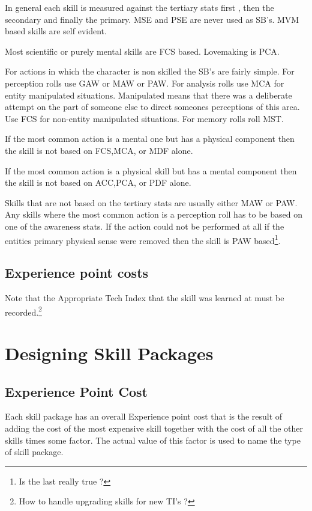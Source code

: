In general each skill is measured against the tertiary stats first , then the 
secondary and finally the primary. MSE and PSE are never used as SB's.
MVM based skills are self evident. 

Most scientific or purely mental skills are FCS based.
Lovemaking is PCA.

For actions in which the character is non skilled the SB's are fairly
simple. For perception rolls use GAW or MAW or PAW. For analysis rolls
use MCA for entity manipulated situations. Manipulated means that there
was a deliberate attempt on the part of someone else to direct someones
perceptions of this area. Use FCS for non-entity manipulated
situations. For memory rolls roll MST. 

If the most common action is a mental one but has a physical component then
the skill is not based on FCS,MCA, or MDF alone.

If the most common action is a physical skill but has a mental component then the
skill is not based on ACC,PCA, or PDF alone.

Skills that are not based on the tertiary stats are usually either MAW
or PAW. Any skills where the most common action is a perception roll has
to be based on one of the awareness stats. If the action could not be
performed at all if the entities primary physical sense were removed
then the skill is PAW based\footnote{Is the last really true ?}. 



\subsection{Experience point costs}



Note that the Appropriate Tech Index that the skill was learned at 
must be recorded.\footnote{ How to handle upgrading skills for new TI's ?}

\section{Designing Skill Packages}

\subsection{Experience Point Cost}

Each skill package has an overall Experience point cost that is
the result of adding the cost of the most expensive skill together
with the cost of all the other skills times some factor. The actual value
of this factor is used to name the type of skill package.


